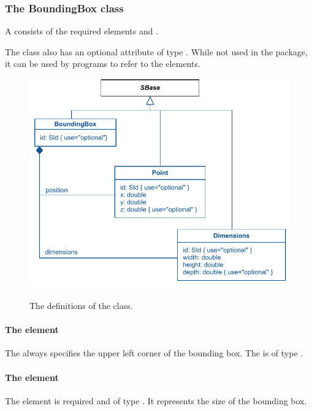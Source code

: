  \subsubsection{The BoundingBox class} \label{boundingbox-class} A 
\BoundingBox consists of the required elements  and . 

The \BoundingBox class also has an optional attribute  of type 
. While not used in the \Layout package, it can be used by programs to refer to the elements. 

\begin{figure}[!h]
\includegraphics{uml/layout-boundingbox-uml}\\
\label{uml:boundingbox}
\caption{The definitions of the \BoundingBox class.}
\end{figure}

\paragraph{The  element} The  always 
specifies the upper left corner of the bounding box. The 
 is of type \Point. 

\paragraph{The  element} The  
element is required and of type \Dimensions. It represents the size of
the bounding box.

